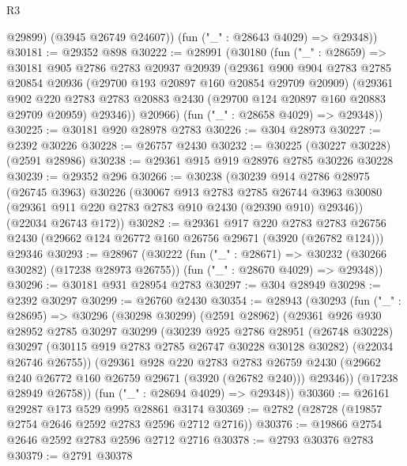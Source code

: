 \begin{lexlean}{R3}
\begin{coremodule}
          @29899)
        (@3945 @26749 @24607))
      (fun ("_" : @28643 @4029) => @29348))
@30181 := @29352 @898
@30222 := @28991
    (@30180
      (fun ("_" : @28659) =>
      @30181
        @905
        @2786
        @2783
        @20937
        @20939
        (@29361
          @900
          @904
          @2783
          @2785
          @20854
          @20936
          (@29700 @193 @20897 @160 @20854 @29709 @20909)
          (@29361
            @902
            @220
            @2783
            @2783
            @20883
            @2430
            (@29700 @124 @20897 @160 @20883 @29709 @20959)
            @29346))
        @20966)
      (fun ("_" : @28658 @4029) => @29348))
@30225 := @30181 @920 @28978 @2783
@30226 := @304 @28973
@30227 := @2392 @30226
@30228 := @26757 @2430
@30232 := @30225 (@30227 @30228) (@2591 @28986)
@30238 := @29361 @915 @919 @28976 @2785 @30226 @30228
@30239 := @29352 @296
@30266 := @30238
    (@30239
      @914
      @2786
      @28975
      (@26745 @3963)
      @30226
      (@30067
        @913
        @2783
        @2785
        @26744
        @3963
        @30080
        (@29361 @911 @220 @2783 @2783 @910 @2430 (@29390 @910) @29346))
      (@22034 @26743 @172))
@30282 := @29361
    @917
    @220
    @2783
    @2783
    @26756
    @2430
    (@29662 @124 @26772 @160 @26756 @29671 (@3920 (@26782 @124)))
    @29346
@30293 := @28967
    (@30222
      (fun ("_" : @28671) => @30232 (@30266 @30282) (@17238 @28973 @26755))
      (fun ("_" : @28670 @4029) => @29348))
@30296 := @30181 @931 @28954 @2783
@30297 := @304 @28949
@30298 := @2392 @30297
@30299 := @26760 @2430
@30354 := @28943
    (@30293
      (fun ("_" : @28695) =>
      @30296
        (@30298 @30299)
        (@2591 @28962)
        (@29361
          @926
          @930
          @28952
          @2785
          @30297
          @30299
          (@30239
            @925
            @2786
            @28951
            (@26748 @30228)
            @30297
            (@30115 @919 @2783 @2785 @26747 @30228 @30128 @30282)
            (@22034 @26746 @26755))
          (@29361
            @928
            @220
            @2783
            @2783
            @26759
            @2430
            (@29662 @240 @26772 @160 @26759 @29671 (@3920 (@26782 @240)))
            @29346))
        (@17238 @28949 @26758))
      (fun ("_" : @28694 @4029) => @29348))
@30360 := @26161 @29287 @173 @529 @995 @28861 @3174
@30369 := @2782 (@28728 (@19857 @2754 @2646 @2592 @2783 @2596 @2712 @2716))
@30376 := @19866 @2754 @2646 @2592 @2783 @2596 @2712 @2716
@30378 := @2793 @30376 @2783
@30379 := @2791 @30378

\end{coremodule}
\end{lexlean}
